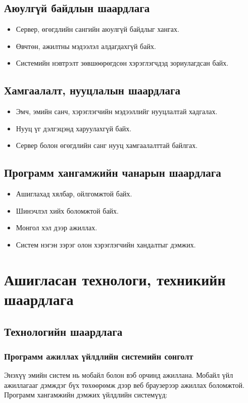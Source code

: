 \subsection{Аюулгүй байдлын шаардлага}
\begin{itemize}
    \item Сервер, өгөгдлийн сангийн аюулгүй байдлыг хангах.
    \item Өвчтөн, ажилтны мэдээлэл алдагдахгүй байх.
    \item Системийн нэвтрэлт зөвшөөрөгдсөн хэрэглэгчдэд зориулагдсан байх.
\end{itemize}

\subsection{Хамгаалалт, нууцлалын шаардлага}
\begin{itemize}
    \item Эмч, эмийн санч, хэрэглэгчийн мэдээллийг нууцлалтай хадгалах.
    \item Нууц үг дэлгэцэнд харуулахгүй байх.
    \item Сервер болон өгөгдлийн санг нууц хамгаалалттай байлгах.
\end{itemize}

\subsection{Программ хангамжийн чанарын шаардлага}
\begin{itemize}
    \item Ашиглахад хялбар, ойлгомжтой байх.
    \item Шинэчлэл хийх боломжтой байх.
    \item Монгол хэл дээр ажиллах.
    \item Систем нэгэн зэрэг олон хэрэглэгчийн хандалтыг дэмжих.
\end{itemize}

\section{Ашигласан технологи, техникийн шаардлага}

\subsection{Технологийн шаардлага}

\subsubsection{Программ ажиллах үйлдлийн системийн сонголт}
\qquad
Энэхүү эмийн систем нь мобайл болон вэб орчинд ажиллана. Мобайл үйл ажиллагааг дэмждэг бүх төхөөрөмж дээр веб браузерээр ажиллах боломжтой. Программ хангамжийн дэмжих үйлдлийн системүүд:

